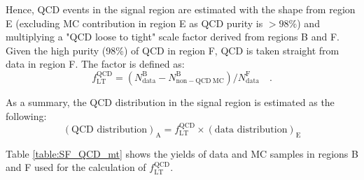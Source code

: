 Hence, QCD events in the signal region are estimated with the shape from region E 
(excluding MC contribution in region E as QCD purity is $> 98\%$) and multiplying 
a "QCD loose to tight" scale factor derived from regions B and F. Given the high 
purity (98\%) of QCD in region F, QCD is taken straight from data in region F. 
The factor is defined as:
\begin{equation}\label{eq:et_qcd_sf}
f_\mathrm{LT}^\mathrm{QCD} = \left(N_\mathrm{data}^\mathrm{B} - N_\mathrm{non-QCD~MC}^\mathrm{B}\right)
/ N_\mathrm{data}^\mathrm{F}\quad.
\end{equation}

As a summary, the QCD distribution in the signal region is estimated as the following:
\begin{equation}
(\text{QCD distribution})_{\text{A}} = f_\mathrm{LT}^\mathrm{QCD} \times (\text{data distribution})_{\text{E}} 
\end{equation}

Table \ref{table:SF_QCD_mt} shows the yields of data and MC samples in regions B 
and F used for the calculation of $f_\mathrm{LT}^\mathrm{QCD}$.

{\renewcommand{\arraystretch}{1.3}%
\begin{table}
   \caption{\label{table:SF_QCD_mt} Event yields in regions B and F used for the calculation of $f_\mathrm{LT}^\mathrm{QCD}$.}
 \end{table}}

